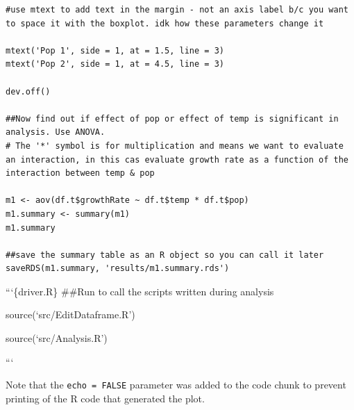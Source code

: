 \documentclass[
]{article}
\begin{document}
\begin{verbatim}
#use mtext to add text in the margin - not an axis label b/c you want to space it with the boxplot. idk how these parameters change it

mtext('Pop 1', side = 1, at = 1.5, line = 3)
mtext('Pop 2', side = 1, at = 4.5, line = 3)

dev.off()

##Now find out if effect of pop or effect of temp is significant in analysis. Use ANOVA. 
# The '*' symbol is for multiplication and means we want to evaluate an interaction, in this cas evaluate growth rate as a function of the interaction between temp & pop

m1 <- aov(df.t$growthRate ~ df.t$temp * df.t$pop)
m1.summary <- summary(m1)
m1.summary

##save the summary table as an R object so you can call it later
saveRDS(m1.summary, 'results/m1.summary.rds')
\end{verbatim}

```\{driver.R\} \#\#Run to call the scripts written during analysis

source(`src/EditDataframe.R')

source(`src/Analysis.R')

```

Note that the \texttt{echo\ =\ FALSE} parameter was added to the code
chunk to prevent printing of the R code that generated the plot.
\end{document}
